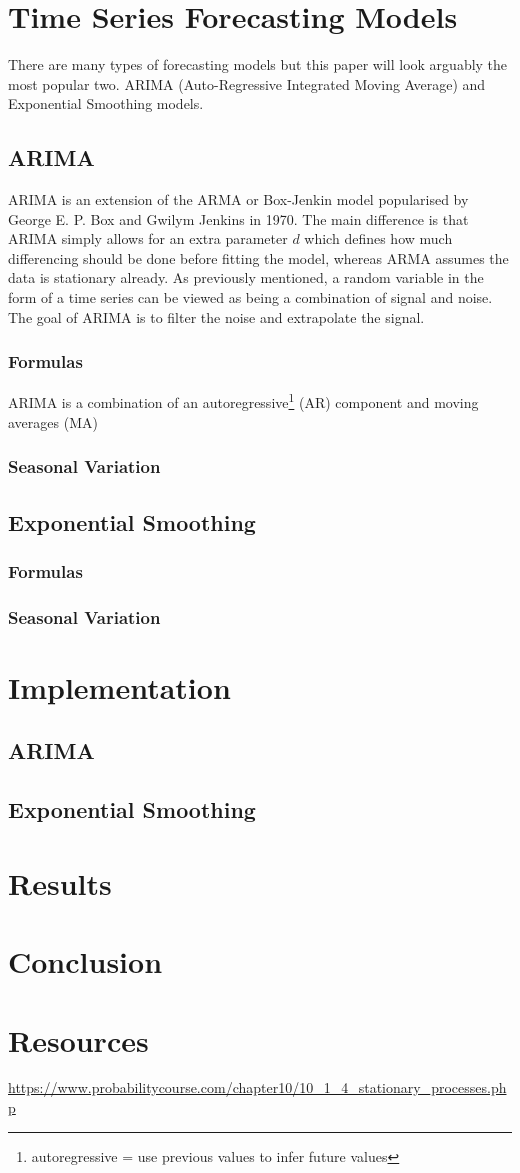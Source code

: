 \documentclass{article}
\begin{document}
  \section{Time Series Forecasting Models}
  There are many types of forecasting models but this paper will look arguably the most popular two. ARIMA (Auto-Regressive Integrated Moving Average) and Exponential Smoothing models. 
  \subsection{ARIMA}
  ARIMA is an extension of the ARMA or Box-Jenkin model popularised by George E. P. Box and Gwilym Jenkins in 1970. The main difference is that ARIMA simply allows for an extra parameter $d$ which defines how much differencing should be done before fitting the model, whereas ARMA assumes the data is stationary already. 
  As previously mentioned, a random variable in the form of a time series can be viewed as being a combination of signal and noise. The goal of ARIMA is to filter the noise and extrapolate the signal.
  \subsubsection{Formulas}
  ARIMA is a combination of an autoregressive\footnote{autoregressive = use previous values to infer future values} (AR) component and moving averages (MA)
  \subsubsection{Seasonal Variation}
  \subsection{Exponential Smoothing}
  \subsubsection{Formulas}
  \subsubsection{Seasonal Variation}

  \section{Implementation}
  \subsection{ARIMA}
  \subsection{Exponential Smoothing}

  \section{Results}

  \section{Conclusion}

  \section{Resources}
  \url{https://www.probabilitycourse.com/chapter10/10_1_4_stationary_processes.php}

  \newpage
\end{document}
